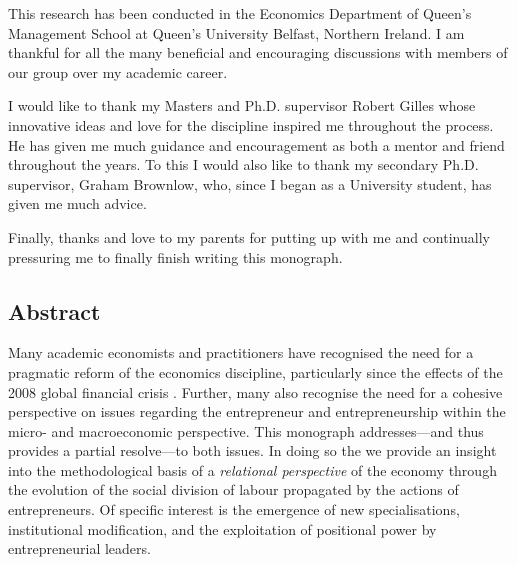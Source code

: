 \documentclass[11pt,fleqn]{book}
\begin{document}
This research has been conducted in the Economics Department of Queen's Management School at Queen's University Belfast, Northern Ireland. I am thankful for all the many beneficial and encouraging discussions with members of our group over my academic career. 

I would like to thank my Masters and Ph.D. supervisor Robert Gilles whose innovative ideas and love for the discipline inspired me throughout the process. He has given me much guidance and encouragement as both a mentor and friend throughout the years. To this I would also like to thank my secondary Ph.D. supervisor, Graham Brownlow, who, since I began as a University student, has given me much advice.

Finally, thanks and love to my parents for putting up with me and continually pressuring me to finally finish writing this monograph.

\newpage

\setcounter{page}{1} 

\begin{singlespace}
\setcounter{tocdepth}{2}
\tableofcontents

\listoffigures

\chapter*{Abstract}


Many academic economists and practitioners have recognised the need for a pragmatic reform of the economics discipline, particularly since the effects of the 2008 global financial crisis \citep{Hodgson2009}. Further, many also recognise the need for a cohesive perspective on issues regarding the entrepreneur and entrepreneurship within the micro- and macroeconomic perspective. This monograph addresses---and thus provides a partial resolve---to both issues. In doing so the we provide an insight into the methodological basis of a \emph{relational perspective} of the economy through the evolution of the social division of labour propagated by the actions of entrepreneurs. Of specific interest is the emergence of new specialisations, institutional modification, and the exploitation of positional power by entrepreneurial leaders.

\end{singlespace}

\newpage













\singlespace




\end{document}
